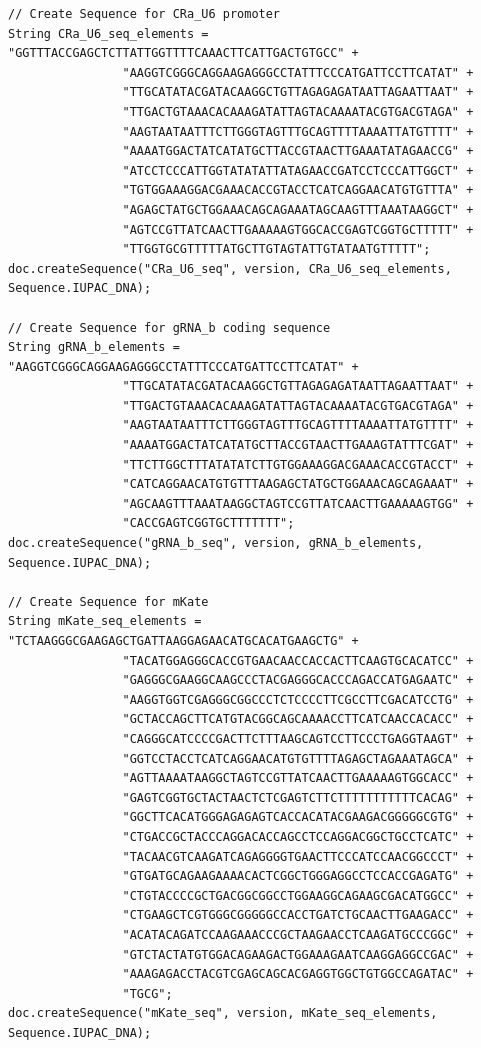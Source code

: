 \vspace{\abovedisplayskip}
\begin{minipage}{0.95\textwidth}%
\begin{lstlisting}[basicstyle=\tt\footnotesize]
// Create Sequence for CRa_U6 promoter
String CRa_U6_seq_elements = "GGTTTACCGAGCTCTTATTGGTTTTCAAACTTCATTGACTGTGCC" +
                "AAGGTCGGGCAGGAAGAGGGCCTATTTCCCATGATTCCTTCATAT" +
                "TTGCATATACGATACAAGGCTGTTAGAGAGATAATTAGAATTAAT" +
                "TTGACTGTAAACACAAAGATATTAGTACAAAATACGTGACGTAGA" +
                "AAGTAATAATTTCTTGGGTAGTTTGCAGTTTTAAAATTATGTTTT" +
                "AAAATGGACTATCATATGCTTACCGTAACTTGAAATATAGAACCG" +
                "ATCCTCCCATTGGTATATATTATAGAACCGATCCTCCCATTGGCT" +
                "TGTGGAAAGGACGAAACACCGTACCTCATCAGGAACATGTGTTTA" +
                "AGAGCTATGCTGGAAACAGCAGAAATAGCAAGTTTAAATAAGGCT" +
                "AGTCCGTTATCAACTTGAAAAAGTGGCACCGAGTCGGTGCTTTTT" +
                "TTGGTGCGTTTTTATGCTTGTAGTATTGTATAATGTTTTT";
doc.createSequence("CRa_U6_seq", version, CRa_U6_seq_elements, Sequence.IUPAC_DNA); 
		
// Create Sequence for gRNA_b coding sequence
String gRNA_b_elements = "AAGGTCGGGCAGGAAGAGGGCCTATTTCCCATGATTCCTTCATAT" +
                "TTGCATATACGATACAAGGCTGTTAGAGAGATAATTAGAATTAAT" +
                "TTGACTGTAAACACAAAGATATTAGTACAAAATACGTGACGTAGA" +
                "AAGTAATAATTTCTTGGGTAGTTTGCAGTTTTAAAATTATGTTTT" +
                "AAAATGGACTATCATATGCTTACCGTAACTTGAAAGTATTTCGAT" +
                "TTCTTGGCTTTATATATCTTGTGGAAAGGACGAAACACCGTACCT" +
                "CATCAGGAACATGTGTTTAAGAGCTATGCTGGAAACAGCAGAAAT" +
                "AGCAAGTTTAAATAAGGCTAGTCCGTTATCAACTTGAAAAAGTGG" +
                "CACCGAGTCGGTGCTTTTTTT";
doc.createSequence("gRNA_b_seq", version, gRNA_b_elements, Sequence.IUPAC_DNA);
		
// Create Sequence for mKate
String mKate_seq_elements = "TCTAAGGGCGAAGAGCTGATTAAGGAGAACATGCACATGAAGCTG" +
                "TACATGGAGGGCACCGTGAACAACCACCACTTCAAGTGCACATCC" +
                "GAGGGCGAAGGCAAGCCCTACGAGGGCACCCAGACCATGAGAATC" +
                "AAGGTGGTCGAGGGCGGCCCTCTCCCCTTCGCCTTCGACATCCTG" +
                "GCTACCAGCTTCATGTACGGCAGCAAAACCTTCATCAACCACACC" +
                "CAGGGCATCCCCGACTTCTTTAAGCAGTCCTTCCCTGAGGTAAGT" +
                "GGTCCTACCTCATCAGGAACATGTGTTTTAGAGCTAGAAATAGCA" +
                "AGTTAAAATAAGGCTAGTCCGTTATCAACTTGAAAAAGTGGCACC" +
                "GAGTCGGTGCTACTAACTCTCGAGTCTTCTTTTTTTTTTTCACAG" +
                "GGCTTCACATGGGAGAGAGTCACCACATACGAAGACGGGGGCGTG" +
                "CTGACCGCTACCCAGGACACCAGCCTCCAGGACGGCTGCCTCATC" +
                "TACAACGTCAAGATCAGAGGGGTGAACTTCCCATCCAACGGCCCT" +
                "GTGATGCAGAAGAAAACACTCGGCTGGGAGGCCTCCACCGAGATG" +
                "CTGTACCCCGCTGACGGCGGCCTGGAAGGCAGAAGCGACATGGCC" +
                "CTGAAGCTCGTGGGCGGGGGCCACCTGATCTGCAACTTGAAGACC" +
                "ACATACAGATCCAAGAAACCCGCTAAGAACCTCAAGATGCCCGGC" +
                "GTCTACTATGTGGACAGAAGACTGGAAAGAATCAAGGAGGCCGAC" +
                "AAAGAGACCTACGTCGAGCAGCACGAGGTGGCTGTGGCCAGATAC" +
                "TGCG";
doc.createSequence("mKate_seq", version, mKate_seq_elements, Sequence.IUPAC_DNA);


\end{lstlisting}
\end{minipage}
